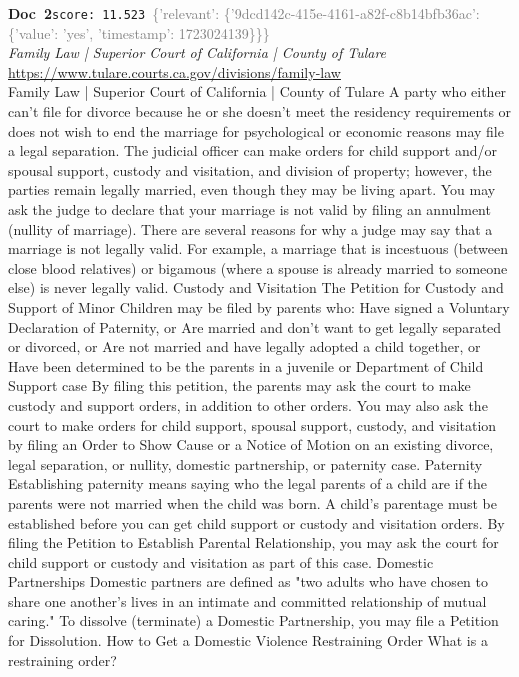 \documentclass[a4paper,11pt]{article}
\begin{document}
\begin{docenv}
{\footnotesize\textcolor{doccolor}{\textbf{Doc~2}}}\hfill{\tiny\texttt{score:~11.523}}\ {\tiny\textcolor{gray}{\{'relevant': \{'9dcd142c-415e-4161-a82f-c8b14bfb36ac': \{'value': 'yes', 'timestamp': 1723024139\}\}\}}}\\[3pt]
{\small\textit{Family Law | Superior Court of California | County of Tulare}}\\[2pt]
{\tiny\url{https://www.tulare.courts.ca.gov/divisions/family-law}}\\[4pt]
{\footnotesize Family Law | Superior Court of California | County of Tulare
A party who either can't file for divorce because he or she doesn't meet the residency requirements or does not wish to end the marriage for psychological or economic reasons may file a legal separation. The judicial officer can make orders for child support and/or spousal support, custody and visitation, and division of property; however, the parties remain legally married, even though they may be living apart.
You may ask the judge to declare that your marriage is not valid by filing an annulment (nullity of marriage). There are several reasons for why a judge may say that a marriage is not legally valid. For example, a marriage that is incestuous (between close blood relatives) or bigamous (where a spouse is already married to someone else) is never legally valid.
Custody and Visitation
The Petition for Custody and Support of Minor Children may be filed by parents who:
Have signed a Voluntary Declaration of Paternity, or
Are married and don't want to get legally separated or divorced, or
Are not married and have legally adopted a child together, or
Have been determined to be the parents in a juvenile or Department of Child Support case
By filing this petition, the parents may ask the court to make custody and support orders, in addition to other orders.
You may also ask the court to make orders for child support, spousal support, custody, and visitation by filing an Order to Show Cause or a Notice of Motion on an existing divorce, legal separation, or nullity, domestic partnership, or paternity case.
Paternity
Establishing paternity means saying who the legal parents of a child are if the parents were not married when the child was born.
A child's parentage must be established before you can get child support or custody and visitation orders. By filing the Petition to Establish Parental Relationship, you may ask the court for child support or custody and visitation as part of this case.
Domestic Partnerships
Domestic partners are defined as "two adults who have chosen to share one another's lives in an intimate and committed relationship of mutual caring."
To dissolve (terminate) a Domestic Partnership, you may file a Petition for Dissolution.
How to Get a Domestic Violence Restraining Order
What is a restraining order?}
\end{docenv}
\end{document}
